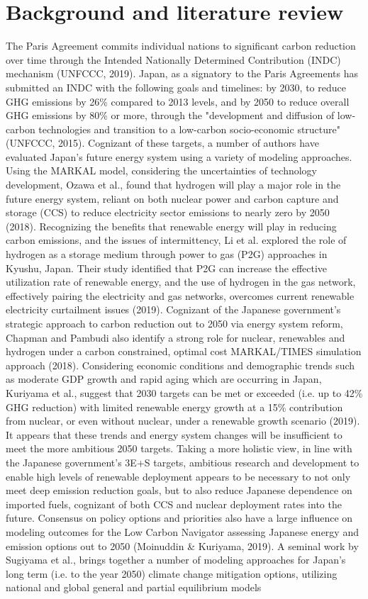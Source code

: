 \section{Background and literature review} \label{litreview}
The Paris Agreement commits individual nations to significant carbon reduction over time through the Intended Nationally Determined Contribution (INDC) mechanism (UNFCCC, 2019). Japan, as a signatory to the Paris Agreements has submitted an INDC with the following goals and timelines: by 2030, to reduce GHG emissions by 26\% compared to 2013 levels, and by 2050 to reduce overall GHG emissions by 80\% or more, through the "development and diffusion of low-carbon technologies and transition to a low-carbon socio-economic structure" (UNFCCC, 2015). Cognizant of these targets, a number of authors have evaluated Japan's future energy system using a variety of modeling approaches. Using the MARKAL model, considering the uncertainties of technology development, Ozawa et al., found that hydrogen will play a major role in the future energy system, reliant on both nuclear power and carbon capture and storage (CCS) to reduce electricity sector emissions to nearly zero by 2050 (2018). Recognizing the benefits that renewable energy will play in reducing carbon emissions, and the issues of intermittency, Li et al. explored the role of hydrogen as a storage medium through power to gas (P2G) approaches in Kyushu, Japan. Their study identified that P2G can increase the effective utilization rate of renewable energy, and the use of hydrogen in the gas network, effectively pairing the electricity and gas networks, overcomes current renewable electricity curtailment issues (2019). Cognizant of the Japanese government's strategic approach to carbon reduction out to 2050 via energy system reform, Chapman and Pambudi also identify a strong role for nuclear, renewables and hydrogen under a carbon constrained, optimal cost MARKAL/TIMES simulation approach (2018). Considering economic conditions and demographic trends such as moderate GDP growth and rapid aging which are occurring in Japan, Kuriyama et al., suggest that 2030 targets can be met or exceeded (i.e. up to 42\% GHG reduction) with limited renewable energy growth at a 15\% contribution from nuclear, or even without nuclear, under a renewable growth scenario (2019). It appears that these trends and energy system changes will be insufficient to meet the more ambitious 2050 targets. Taking a more holistic view, in line with the Japanese government's 3E+S targets, ambitious research and development to enable high levels of renewable deployment appears to be necessary to not only meet deep emission reduction goals, but to also reduce Japanese dependence on imported fuels, cognizant of both CCS and nuclear deployment rates into the future. Consensus on policy options and priorities also have a large influence on modeling outcomes for the  Low Carbon Navigator assessing Japanese energy and emission options out to 2050 (Moinuddin \& Kuriyama, 2019). A seminal work by Sugiyama et al., brings together a number of modeling approaches for Japan's long term (i.e. to the year 2050) climate change mitigation options, utilizing national and global general and partial equilibrium models 